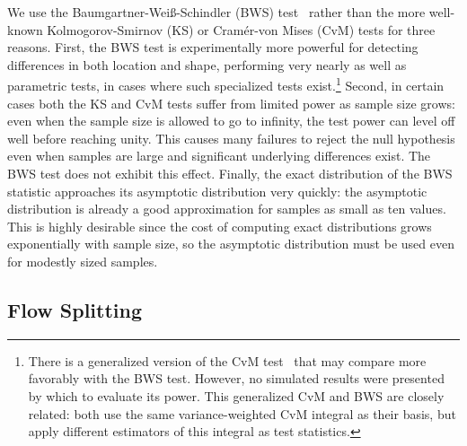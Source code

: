\documentclass[conference]{IEEEtran}
\newcommand{\caps}[1]{{\small{#1}}}
\begin{document}
We use the Baumgartner-Wei\ss-Schindler (\caps{BWS}) test~\cite{Baumgartner98} rather than the more well-known Kolmogorov-Smirnov (\caps{KS}) or Cram\'er-von Mises (\caps{CvM}) tests for three reasons. First, the \caps{BWS} test is experimentally more powerful for detecting differences in both location and shape, performing very nearly as well as parametric tests, in cases where such specialized tests exist.\footnote{There is a generalized version of the CvM test~\cite{Pettitt79} that may compare more favorably with the BWS test. However, no simulated results were presented by which to evaluate its power. This generalized CvM and BWS are closely related: both use the same variance-weighted CvM integral as their basis, but apply different estimators of this integral as test statistics.} Second, in certain cases both the \caps{KS} and \caps{CvM} tests suffer from limited power as sample size grows: even when the sample size is allowed to go to infinity, the test power can level off well before reaching unity. This causes many failures to reject the null hypothesis even when samples are large and significant underlying differences exist. The \caps{BWS} test does not exhibit this effect. Finally, the exact distribution of the \caps{BWS} statistic approaches its asymptotic distribution very quickly: the asymptotic distribution is already a good approximation for samples as small as ten values. This is highly desirable since the cost of computing exact distributions grows exponentially with sample size, so the asymptotic distribution must be used even for modestly sized samples.


\subsection{Flow Splitting}\label{sec:flow-splitting}
\end{document}
